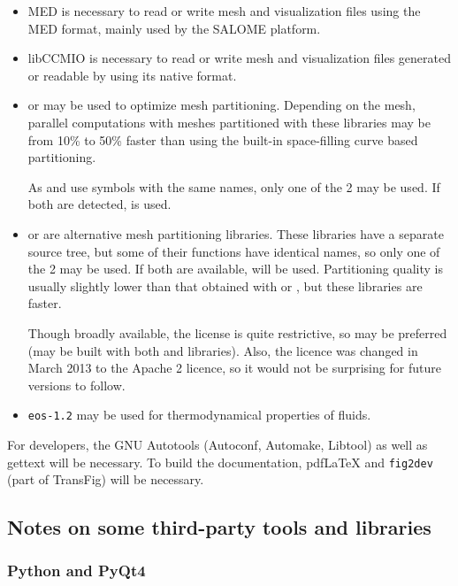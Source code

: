 \documentclass[a4paper,10pt,twoside]{csshortdoc}
\begin{document}
\begin{itemize}
\item MED is necessary to read or write mesh and visualization files
      using the MED format, mainly used by the SALOME platform.

\item libCCMIO is necessary to read or write mesh and visualization files
      generated or readable by \starccmp using its native format.

\item \scotch or \ptscotch may be used to optimize mesh partitioning.
      Depending on the mesh, parallel computations with meshes partitioned
      with these libraries may be from 10\% to 50\% faster than using the
      built-in space-filling curve based partitioning.

      As \scotch and \ptscotch use symbols with the same names, only
      one of the 2 may be used. If both are detected, \ptscotch is used.

\item \metis or \parmetis are alternative mesh partitioning libraries.
      These libraries have a separate source tree, but some of their
      functions have identical names, so only one of the 2 may be used.
      If both are available, \parmetis will be used. Partitioning
      quality is usually slightly lower than that obtained with \scotch or
      \ptscotch, but these libraries are faster.

      Though broadly available, the \parmetis license is quite restrictive,
      so \ptscotch may be preferred (\CS may be built with both
      \metis and \scotch libraries). Also, the \metis licence was changed
      in March 2013 to the Apache 2 licence, so it would not be surprising
      for future \parmetis versions to follow.

\item \texttt{eos-1.2} may be used for thermodynamical properties of fluids.

\end{itemize}

For developers, the GNU Autotools (Autoconf, Automake, Libtool) as
well as gettext will be necessary. To build the documentation,
pdf\LaTeX{} and \texttt{fig2dev} (part of TransFig) will be necessary.

\subsection{Notes on some third-party tools and libraries}

\subsubsection{Python and PyQt4\label{sec:ext:python}}
\end{document}
